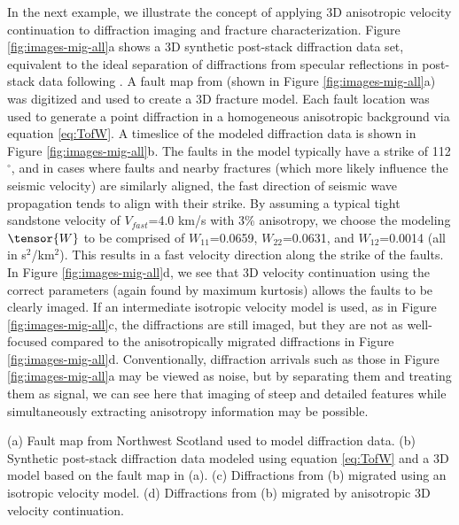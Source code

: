 In the next example, we illustrate the concept of applying 3D
anisotropic velocity continuation to diffraction imaging and fracture
characterization.  
Figure \ref{fig:images-mig-all}a shows a 3D synthetic
post-stack diffraction data set, equivalent to the ideal separation of
diffractions from specular reflections in post-stack data following 
\cite{fomel_landa_taner07}.  
A fault map from \cite{hargrove10} (shown in Figure \ref{fig:images-mig-all}a) was digitized and used to create a 3D fracture model.  
Each fault location was used to generate a point diffraction in a homogeneous anisotropic
background via equation \ref{eq:TofW}. 
A timeslice of the modeled diffraction data is shown in Figure \ref{fig:images-mig-all}b.
The faults in the model typically have a strike of 112$^{\circ }$, and
in cases where faults and nearby fractures (which more likely influence the seismic velocity) 
are similarly aligned, the fast direction of
seismic wave propagation tends to align with their strike.  
By assuming a typical tight sandstone velocity of $V_{fast}$=4.0 km/s with 3\%
anisotropy, we choose the modeling $\tensor{W}$ to be comprised of
$W_{11}$=0.0659, $W_{22}$=0.0631, and $W_{12}$=0.0014 (all in s$^2$/km$^2$).  
This results in a fast velocity direction along the strike of the faults.
In Figure \ref{fig:images-mig-all}d, we see that 3D velocity continuation using the
correct parameters (again found by maximum kurtosis) allows the faults
to be clearly imaged.  
If an intermediate isotropic velocity model is used, as in Figure \ref{fig:images-mig-all}c, 
the diffractions are still imaged, but they are not as well-focused compared to 
the anisotropically migrated diffractions in Figure \ref{fig:images-mig-all}d.
Conventionally, diffraction arrivals such as
those in Figure \ref{fig:images-mig-all}a may be viewed as noise, but by
separating them and treating them as signal, we can see here that
imaging of steep and detailed features while simultaneously extracting
anisotropy information may be possible.

{(a) Fault map from Northwest Scotland \cite[]{hargrove10} used to model diffraction data. (b) Synthetic post-stack diffraction data modeled using equation \ref{eq:TofW} and a 3D model based on the fault map in (a).  (c) Diffractions from (b) migrated using an isotropic velocity model.  (d) Diffractions from (b) migrated by anisotropic 3D velocity continuation.}

